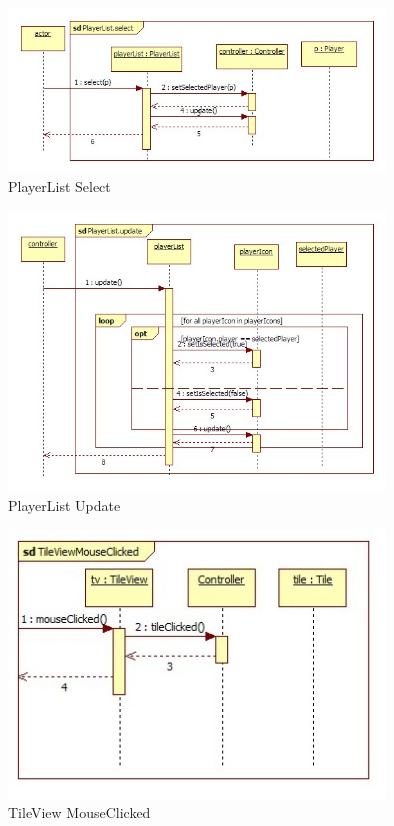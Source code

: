 \begin{figure}[H]
	\begin{center}
		\includegraphics[width=10cm]{chapters/chapter11/seq/PlayerList_select.jpg}
		\caption{PlayerList Select}
		\label{PlayerList Select}
	\end{center}
\end{figure}
\begin{figure}[H]
	\begin{center}
		\includegraphics[width=10cm]{chapters/chapter11/seq/PlayerList_update.jpg}
		\caption{PlayerList Update}
		\label{PlayerList Update}
	\end{center}
\end{figure}
\begin{figure}[H]
	\begin{center}
		\includegraphics[width=10cm]{chapters/chapter11/seq/TileView_MouseClicked.jpg}
		\caption{TileView MouseClicked}
		\label{TileView MouseClicked}
	\end{center}
\end{figure}
